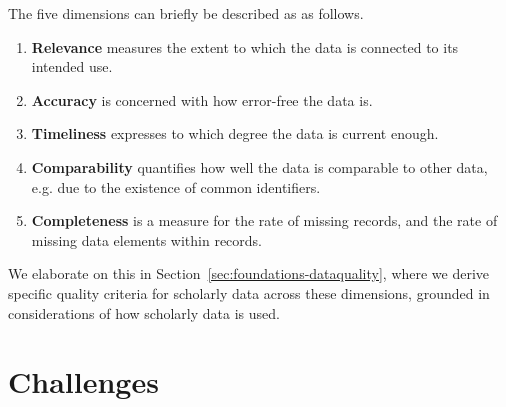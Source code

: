 The five dimensions can briefly be described as as follows.

\begin{enumerate}
    \item \textbf{Relevance} measures the extent to which the data is connected to its intended use.
    \item \textbf{Accuracy} is concerned with how error-free the data is.
    \item \textbf{Timeliness} expresses to which degree the data is current enough.
    \item \textbf{Comparability} quantifies how well the data is comparable to other data, e.g. due to the existence of common identifiers.
    \item \textbf{Completeness} is a measure for the rate of missing records, and the rate of missing data elements within records.
\end{enumerate}

We elaborate on this in Section~\ref{sec:foundations-dataquality}, where we derive specific quality criteria for scholarly data across these dimensions, grounded in considerations of how scholarly data is used.



\section{Challenges}\label{sec:intro-challenges}



